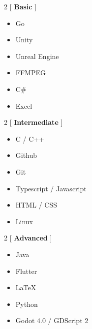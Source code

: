 \documentclass[10pt,a4paper,ragged2e]{altacv}
\begin{document}

\begin{multicols}{2}
[
\textbf{ \Large Basic}
\vspace{-7pt}
]
\begin{itemize}
    \item Go
    \item Unity
    \item Unreal Engine
\end{itemize}
\begin{itemize}
    \item FFMPEG
    \item C\#
    \item Excel
\end{itemize}
\end{multicols}

\begin{multicols}{2}
[
\textbf{ \Large Intermediate}
\vspace{-7pt}
]
\begin{itemize}
    \item C / C++
    \item Github 
    \item Git 
\end{itemize}
\begin{itemize}
    \item Typescript / Javascript
    \item HTML / CSS
    \item Linux
\end{itemize}
\end{multicols}

\begin{multicols}{2}
[
\textbf{ \Large Advanced}
\vspace{-7pt}
]
\begin{itemize}
    \item Java
    \item Flutter
    \item LaTeX
\end{itemize}
\begin{itemize}
    \item Python
    \item Godot 4.0 / GDScript 2
\end{itemize}
\end{multicols}

\clearpage
\end{document}
